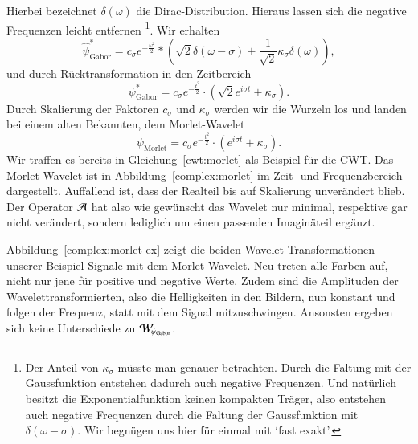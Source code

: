Hierbei bezeichnet $\delta(\omega)$ die Dirac-Distribution.
Hieraus lassen sich die negative Frequenzen leicht entfernen
\footnote{
	Der Anteil von $\kappa_\sigma$ müsste man genauer betrachten.
	Durch die Faltung mit der Gaussfunktion entstehen dadurch auch negative Frequenzen.
	Und natürlich besitzt die Exponentialfunktion keinen kompakten Träger, also entstehen auch negative Frequenzen durch die Faltung der Gaussfunktion mit $\delta(\omega - \sigma)$.
	Wir begnügen uns hier für einmal mit `fast exakt'.
}.
Wir erhalten
\[
	\hat{\psi}^\ast_\text{Gabor} = 
	c_\sigma e^{- \frac{\omega^2}{2}} * (
	\!\sqrt 2 \delta(\omega - \sigma) +
	\frac{1}{\sqrt 2}\kappa_\sigma\delta(\omega) ),
\]
und durch Rücktransformation in den Zeitbereich
\[
	\psi^\ast_\text{Gabor} = c_\sigma e^{- \frac{t^2}{2}} \cdot (\!\sqrt 2 e^{i\sigma t} +	\kappa_\sigma ).
\]
Durch Skalierung der Faktoren $c_\sigma$ und $\kappa_\sigma$ werden wir die Wurzeln los und landen bei einem alten Bekannten, dem Morlet-Wavelet
\[\psi_\text{Morlet} = c_\sigma e^{- \frac{t^2}{2}} \cdot (e^{i\sigma t} + \kappa_\sigma).\]
Wir traffen es bereits in Gleichung~\eqref{cwt:morlet} als Beispiel für die CWT.
Das Morlet-Wavelet ist in Abbildung~\ref{complex:morlet} im Zeit- und Frequenzbereich dargestellt.
Auffallend ist, dass der Realteil bis auf Skalierung unverändert blieb.
Der Operator $\Ana\,$ hat also wie gewünscht das Wavelet nur minimal, respektive gar nicht verändert, sondern lediglich um einen passenden Imaginäteil ergänzt.

Abbildung~\ref{complex:morlet-ex} zeigt die beiden Wavelet-Transformationen unserer Beispiel-Signale mit dem Morlet-Wavelet.
Neu treten alle Farben auf, nicht nur jene für positive und negative Werte.
Zudem sind die Amplituden der Wavelettransformierten, also die Helligkeiten in den Bildern, nun konstant und folgen der Frequenz, statt mit dem Signal mitzuschwingen.
Ansonsten ergeben sich keine Unterschiede zu $\Wave_{\psi_\text{Gabor}}$.

